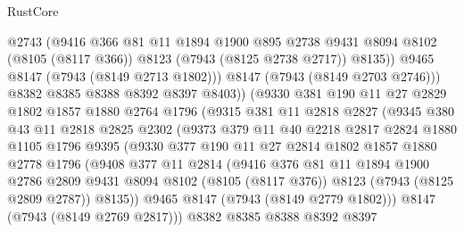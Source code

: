 \begin{lexlean}{RustCore}
\begin{coremodule}
                    @2743
                    (@9416
                      @366
                      @81
                      @11
                      @1894
                      @1900
                      @895
                      @2738
                      @9431
                      @8094
                      @8102
                      (@8105 (@8117 @366))
                      @8123
                      (@7943 (@8125 @2738 @2717))
                      @8135))
                  @9465
                  @8147
                  (@7943 (@8149 @2713 @1802)))
                @8147
                (@7943 (@8149 @2703 @2746)))
              @8382
              @8385
              @8388
              @8392
              @8397
              @8403))
          (@9330
            @381
            @190
            @11
            @27
            @2829
            @1802
            @1857
            @1880
            @2764
            @1796
            (@9315
              @381
              @11
              @2818
              @2827
              (@9345
                @380
                @43
                @11
                @2818
                @2825
                @2302
                (@9373
                  @379
                  @11
                  @40
                  @2218
                  @2817
                  @2824
                  @1880
                  @1105
                  @1796
                  @9395
                  (@9330
                    @377
                    @190
                    @11
                    @27
                    @2814
                    @1802
                    @1857
                    @1880
                    @2778
                    @1796
                    (@9408
                      @377
                      @11
                      @2814
                      (@9416
                        @376
                        @81
                        @11
                        @1894
                        @1900
                        @2786
                        @2809
                        @9431
                        @8094
                        @8102
                        (@8105 (@8117 @376))
                        @8123
                        (@7943 (@8125 @2809 @2787))
                        @8135))
                    @9465
                    @8147
                    (@7943 (@8149 @2779 @1802)))
                  @8147
                  (@7943 (@8149 @2769 @2817)))
                @8382
                @8385
                @8388
                @8392
                @8397

\end{coremodule}
\end{lexlean}

